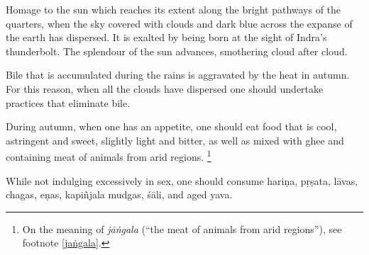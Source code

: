 \begin{translation}
	\item[15--16]
	Homage to the sun %
	which reaches its extent
	along the bright pathways of the quarters, %
	when the sky covered %
	with clouds and dark blue %
	across the expanse of the earth has dispersed. %
	It is exalted by being born at the sight of Indra’s thunderbolt. %
	The splendour of the sun advances, smothering cloud after cloud.

	\item[17]
	Bile that is accumulated during the rains is aggravated by the heat in autumn. For this reason, when all the clouds have dispersed one should undertake practices that eliminate bile.

	\item[18]

	During autumn, when one has an appetite, one should eat food that is cool, astringent and sweet, slightly light and  bitter, as well as mixed with ghee and containing meat of animals from arid regions.%
	\footnote{On the meaning of \emph{jāṅgala} (``the meat of animals from arid regions''), see footnote \ref{jaṅgala}.}

	\item[19]
	While not indulging excessively in sex, one should consume \gls{hariṇa}, %
	\gls{pṛṣata}, %
	\glspl{lāva}, %
	\glspl{chaga}, %
	\glspl{eṇa}, %
	\gls{kapiñjala} %
	\glspl{mudga}, %
	\gls{śāli}, and aged \gls{yava}. %


\end{translation}
